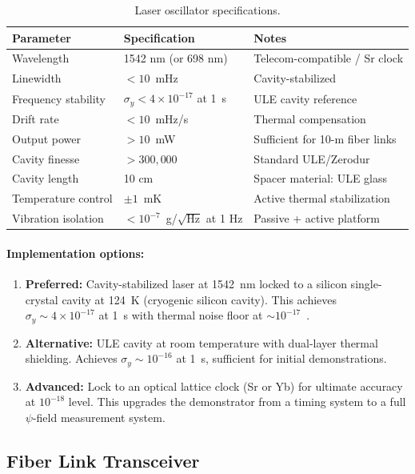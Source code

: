 \documentclass[12pt,letterpaper]{article}
\begin{document}
\begin{table}[h]
\centering
\caption{Laser oscillator specifications.}
\label{tab:laser}
\begin{tabular}{@{}lll@{}}
\toprule
Parameter & Specification & Notes \\
\midrule
Wavelength & 1542 nm (or 698 nm) & Telecom-compatible / Sr clock \\
Linewidth & $< 10$~mHz & Cavity-stabilized \\
Frequency stability & $\sigma_y < 4\times10^{-17}$ at 1~s & ULE cavity reference \\
Drift rate & $< 10$~mHz/s & Thermal compensation \\
Output power & $> 10$~mW & Sufficient for 10-m fiber links \\
Cavity finesse & $> 300{,}000$ & Standard ULE/Zerodur \\
Cavity length & 10 cm & Spacer material: ULE glass \\
Temperature control & $\pm 1$~mK & Active thermal stabilization \\
Vibration isolation & $< 10^{-7}$~g/$\sqrt{\text{Hz}}$ at 1 Hz & Passive + active platform \\
\bottomrule
\end{tabular}
\end{table}

\paragraph{Implementation options:}
\begin{enumerate}
\item \textbf{Preferred:} Cavity-stabilized laser at 1542~nm locked to a
silicon single-crystal cavity at 124~K (cryogenic silicon cavity). This
achieves $\sigma_y \sim 4\times10^{-17}$ at 1~s with thermal noise floor
at $\sim 10^{-17}$~\cite{Matei2017}.

\item \textbf{Alternative:} ULE cavity at room temperature with dual-layer
thermal shielding. Achieves $\sigma_y \sim 10^{-16}$ at 1~s, sufficient for
initial demonstrations.

\item \textbf{Advanced:} Lock to an optical lattice clock (Sr or Yb) for
ultimate accuracy at $10^{-18}$ level. This upgrades the demonstrator from
a timing system to a full $\psi$-field measurement system.
\end{enumerate}

\subsection{Fiber Link Transceiver}
\end{document}
